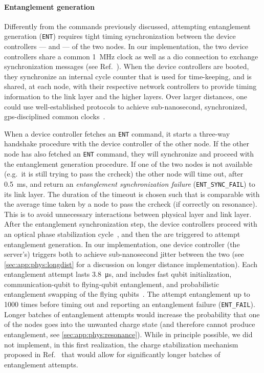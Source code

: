 \paragraph{Entanglement generation}

Differently from the commands previously discussed, attempting entanglement generation
(\texttt{ENT}) requires tight timing synchronization between the device controllers --- and
 --- of the two nodes. In our implementation, the two device controllers share a
common \qty{1}{MHz} clock as well as a \acrshort{dio} connection to exchange synchronization
messages (see Ref.~\cite{pompili_2021_multinode}). When the device controllers are booted, they
synchronize an internal cycle counter that is used for time-keeping, and is shared, at each node,
with their respective network controllers to provide timing information to the link layer and the
higher layers. Over larger distances, one could use well-established protocols to achieve
sub-nanosecond, synchronized, \acrshort{gps}-disciplined common clocks~\cite{whiterabbit}.

When a device controller fetches an \texttt{ENT} command, it starts a three-way handshake procedure
with the device controller of the other node. If the other node has also fetched an \texttt{ENT}
command, they will synchronize and proceed with the entanglement generation procedure. If one of the
two nodes is not available (e.g.~it is still trying to pass the \acrshort{crcheck}) the other node
will time out, after \qty{0.5}{\ms}, and return an \emph{entanglement synchronization failure}
(\texttt{ENT\_SYNC\_FAIL}) to its link layer. The duration of the timeout is chosen such that is
comparable with the average time taken by a node to pass the \acrlong{crcheck} (if correctly on
resonance). This is to avoid unnecessary interactions between physical layer and link layer. After
the entanglement synchronization step, the device controllers proceed with an optical phase
stabilization cycle~\cite{pompili_2021_multinode}, and then the  are triggered to
attempt entanglement generation. In our implementation, one device controller (the server's)
triggers both  to achieve sub-nanosecond jitter between the two 
(see \cref{sec:app:phys:longdist} for a discussion on longer distance implementation). Each
entanglement attempt lasts \qty{3.8}{\us}, and includes fast qubit initialization,
communication-qubit to flying-qubit entanglement, and probabilistic entanglement swapping of the
flying qubits~\cite{pompili_2021_multinode}. The  attempt entanglement up to
\num{1000} times before timing out and reporting an {entanglement failure} (\texttt{ENT\_FAIL}).
Longer batches of entanglement attempts would increase the probability that one of the nodes goes
into the unwanted charge state (and therefore cannot produce entanglement, see
\cref{sec:app:phys:resonance}). While in principle possible, we did not implement, in this first
realization, the charge stabilization mechanism proposed in Ref.~\cite{humphreys_2018_delivery} that
would allow for significantly longer batches of entanglement attempts.

